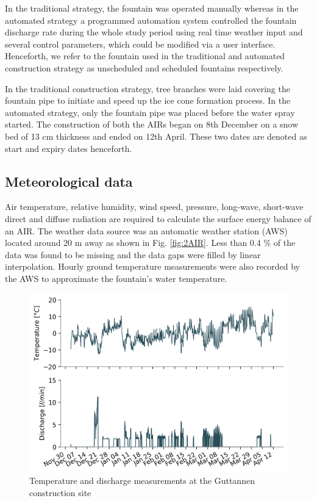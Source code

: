 \documentclass[tc, manuscript]{copernicus}
\begin{document}
In the traditional strategy, the fountain was operated manually whereas in the automated strategy a programmed
automation system controlled the fountain discharge rate during the whole study period using real time weather
input and several control parameters, which could be modified via a user interface. Henceforth, we refer to the
fountain used in the traditional and automated construction strategy as unscheduled and scheduled fountains
respectively.

In the traditional construction strategy, tree branches were laid covering the fountain pipe to initiate and
speed up the ice cone formation process. In the automated strategy, only the fountain pipe was placed before the
water spray started. The construction of both the AIRs began on 8th December on a snow bed of 13 cm thickness
and ended on 12th April. These two dates are denoted as start and expiry dates henceforth.

\subsection{Meteorological data}

Air temperature, relative humidity, wind speed, pressure, long-wave, short-wave direct and diffuse radiation are
required to calculate the surface energy balance of an AIR.  The weather data source was an automatic weather
station (AWS) located around 20 m away as shown in Fig. \ref{fig:2AIR}. Less than 0.4 \% of the data was found
to be missing and the data gaps were filled by linear interpolation. Hourly ground temperature measurements were
also recorded by the AWS to approximate the fountain's water temperature. 

\begin{figure}[t]
\includegraphics[width=12cm]{Figures/disvstemp.png}
\caption{Temperature and discharge measurements at the Guttannen construction site}
\label{fig:aws} 
\end{figure}
\end{document}
